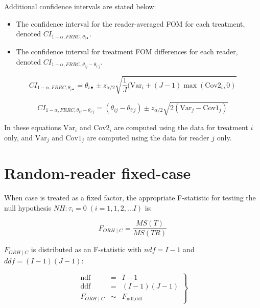 \documentclass[
]{book}
\providecommand{\tightlist}{%
  \setlength{\itemsep}{0pt}\setlength{\parskip}{0pt}}
\begin{document}
Additional confidence intervals are stated below:

\begin{itemize}
\tightlist
\item
  The confidence interval for the reader-averaged FOM for each treatment, denoted \(CI_{1-\alpha,FRRC,\theta_{i \bullet}}\).
\item
  The confidence interval for treatment FOM differences for each reader, denoted \(CI_{1-\alpha,FRRC,\theta_{i j} - \theta_{i' j}}\).
\end{itemize}

\begin{equation}
CI_{1-\alpha,FRRC,\theta_{i \bullet}} = \theta_{i \bullet} \pm z_{\alpha/2}\sqrt{\textstyle\frac{1}{J}(\text{Var}_i+(J-1)\max(\text{Cov2}_i,0)}
\label{eq:CIIndTrtFomFRRC-OR}
\end{equation}

\begin{equation}
CI_{1-\alpha,FRRC,\theta_{i j} - \theta_{i' j}} = (\theta_{i j} - \theta_{i' j}) \pm z_{\alpha/2}\sqrt{2(\text{Var}_j - \text{Cov1}_j)}
\label{eq:CIIndRdrDiffFomFRRC-OR}
\end{equation}

In these equations \(\text{Var}_i\) and \(\text{Cov2}_i\) are computed using the data for treatment \(i\) only, and \(\text{Var}_j\) and \(\text{Cov1}_j\) are computed using the data for reader \(j\) only.

\hypertarget{ORAnalysisSigTesting-RRFCAnalysis}{%
\section{Random-reader fixed-case}\label{ORAnalysisSigTesting-RRFCAnalysis}}

When case is treated as a fixed factor, the appropriate F-statistic for testing the null hypothesis \(NH: \tau_i = 0 \; (i=1,1,2,...I)\) is:

\begin{equation}
F_{ORH \mid C}=\frac{MS(T)}{MS(TR)}
\label{eq:DefFStatRRFC}
\end{equation}

\(F_{ORH \mid C}\) is distributed as an F-statistic with \(ndf = I-1\) and \(ddf = (I-1)(J-1)\):

\begin{equation}
\left.\begin{array}{rcl}
\text{ndf}&=&I-1\\ 
\text{ddf}&=&(I-1)(J-1)\\
F_{ORH \mid C} &\sim& F_{\text{ndf},\text{ddf}}
\end{array}\right\}
\label{eq:FStatRRFC}
\end{equation}
\end{document}

